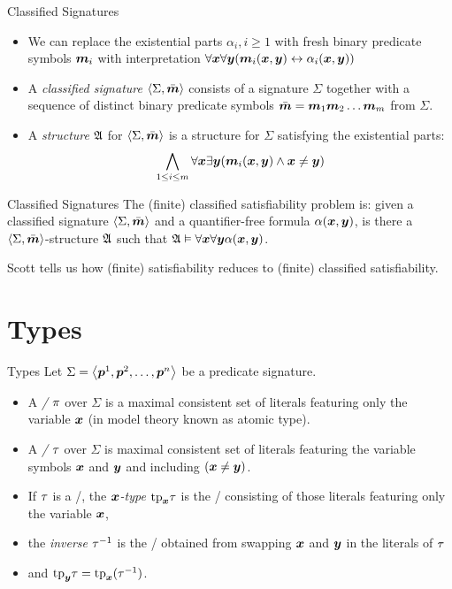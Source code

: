 \documentclass{beamer}
\begin{document}
\begin{frame}{Classified Signatures}
\begin{itemize}
  \item
  We can replace the existential parts $\alpha_i, i \geq 1$ with fresh binary
  predicate symbols $\bm{m}_{i}$ with interpretation
  $\forall\bm{x}\forall\bm{y}(\bm{m}_{i}(\bm{x},\bm{y})\leftrightarrow\alpha_i(\bm{x},\bm{y}))$
  \item A \emph{classified signature} $\left\langle \Sigma,\bar{\bm{m}} \right\rangle$ consists of a signature
  $\Sigma$ together with a sequence of distinct binary predicate symbols $\sms
  = \smm1\smm2\dots\smm\nm$ from $\Sigma$.
  \item A \emph{structure} $\mathfrak{A}$ for $\left\langle \Sigma,\bar{\bm{m}} \right\rangle$ is a structure for
  $\Sigma$ satisfying the existential parts:
  \[\bigwedge_{1\leq i\leq m}\forall\bm{x}\exists\bm{y}(\bm{m}_{i}(\bm{x},\bm{y})\land\bm{x}\neq\bm{y})\]
\end{itemize}
\end{frame}

\begin{frame}{Classified Signatures}
The (finite) classified satisfiability problem is: given a classified signature
$\left\langle \Sigma,\bar{\bm{m}} \right\rangle$ and a quantifier-free formula $\alpha(\bm{x},\bm{y})$, is there a
$\left\langle \Sigma,\bar{\bm{m}} \right\rangle$-structure $\mathfrak{A}$ such that
$\mathfrak{A}\vDash\forall\bm{x}\forall\bm{y}\alpha(\bm{x},\bm{y})$.

Scott tells us how (finite) satisfiability reduces to (finite) classified
satisfiability.
\end{frame}

\section{Types}
\begin{frame}{Types}
Let $\Sigma = \left\langle \bm{p}^{1},\bm{p}^{2},\dots,\bm{p}^{n} \right\rangle$ be a predicate signature.
\begin{itemize}
\item A \emph{\onetype/} $\pi$ over $\Sigma$ is a maximal consistent set of
  literals featuring only the variable $\bm{x}$ (in model theory known as atomic
  type).
  \item A \emph{\twotype/} $\tau$ over $\Sigma$ is maximal consistent set of
  literals featuring the variable symbols $\bm{x}$ and $\bm{y}$ and including
  $(\bm{x} \neq \bm{y})$.
  \item If $\tau$ is a \twotype/, the \emph{$\bm{x}$-type} $\mathrm{tp}_{\bm{x}}\tau$ is the
  \onetype/ consisting of those literals featuring only the variable $\bm{x}$,
  \item the \emph{inverse} $\tau^{-1}$ is the \twotype/ obtained from swapping
  $\bm{x}$ and $\bm{y}$ in the literals of $\tau$ 
  \item and $\mathrm{tp}_{\bm{y}}\tau = \mathrm{tp}_{\bm{x}}(\tau^{-1})$.
\end{itemize}
\end{frame}
\end{document}
